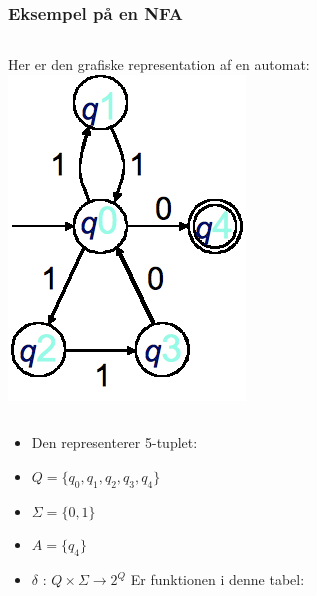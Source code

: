 \begin{frame}
\frametitle{Eksempel på en NFA}
\begin{columns}
\column{9cm}Her er den grafiske representation af en automat:
\column{3cm}\includegraphics[scale=0.3]{images/2_seminar_nondet_states}
\end{columns}
\begin{itemize}[<+->]
  \item Den representerer 5-tuplet:
  \item $Q=\{q_0,q_1,q_2,q_3,q_4\}$
  \item $\Sigma = \{0,1\}$
  \item $A=\{q_4\}$
  \item
      $\delta$ : $Q\times \Sigma \rightarrow 2^Q$ Er funktionen i
      denne tabel: 

  \end{itemize}
\end{frame}
